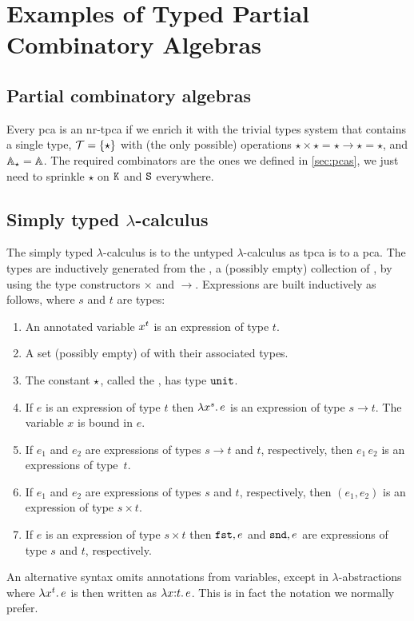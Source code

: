 \section{Examples of Typed Partial Combinatory Algebras}
\label{sec:examples-tpcas}

\subsection{Partial combinatory algebras}

Every pca is an nr-tpca if we enrich it with the trivial types system
that contains a single type, $\mathcal{T} = \set{\star}$ with (the
only possible) operations $\star \times \star = \star \to \star =
\star$, and $\AA_\star = \AA$. The required combinators are the ones we
defined in \cref{sec:pcas}, we just need to sprinkle $\star$ on
$\combK$ and $\combS$ everywhere.


\subsection[\texorpdfstring%
{Simply typed $\lambda$-calculus}%
{Simply typed lambda-calculus}%
]{Simply typed $\lambda$-calculus}
\label{sec:typed-lambda-calculus}

The simply typed $\lambda$-calculus is to the untyped $\lambda$-calculus as
tpca is to a pca. The types are inductively generated from the
, a (possibly empty) collection of
, by using the type constructors $\times$ and
$\to$. Expressions are built inductively as follows, where $s$ and $t$
are types:
%
\begin{enumerate}
\item An annotated variable $\annot{x}{t}$ is an expression of type
  $t$.
\item A set (possibly empty) of  with their associated types.
\item The constant $\ttunit$, called the , has type
  $\unit$.
\item If $e$ is an expression of type $t$ then
  $\lam{\annot{x}{s}}{e}$ is an expression of type $s \to t$. The
  variable $x$ is bound in $e$.
\item If $e_1$ and $e_2$ are expressions of types $s \to t$ and
  $t$, respectively, then $e_1\, e_2$ is an expressions of type~$t$.
\item If $e_1$ and $e_2$ are expressions of types $s$ and $t$,
  respectively, then $(e_1, e_2)$ is an expression of type $s \times
  t$.
\item If $e$ is an expression of type $s \times t$ then $\fst{e}$ and
  $\snd{e}$ are expressions of type $s$ and $t$, respectively.
\end{enumerate}
%
An alternative syntax omits annotations from variables, except in
$\lambda$-abstractions where $\lam{\annot{x}{t}}{e}$ is then written
as $\lam{x \of t}{e}$. This is in fact the notation we normally prefer.

